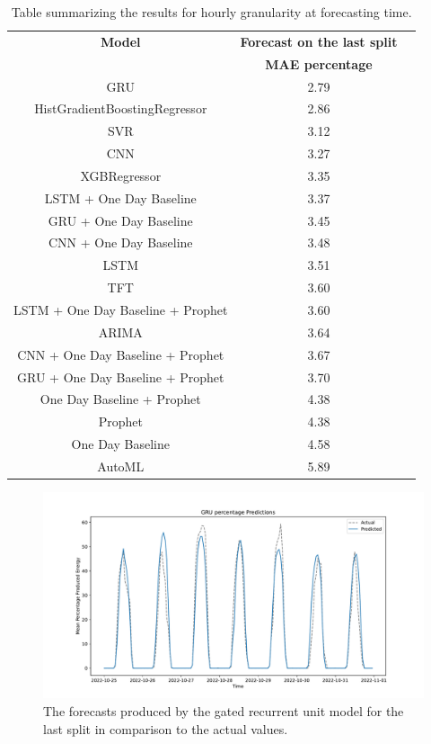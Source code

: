 \begin{table}[H]
\centering
\begin{tabular}{|c|c|c|}
\hline
\textbf{Model} & \textbf{Forecast on the last split}\\
 & \textbf{MAE percentage}\\
\hline
GRU & 2.79\\
\hline
HistGradientBoostingRegressor & 2.86\\
\hline
SVR & 3.12\\
\hline
CNN & 3.27\\
\hline
XGBRegressor & 3.35\\
\hline
LSTM + One Day Baseline & 3.37\\
\hline
GRU + One Day Baseline & 3.45\\
\hline
CNN + One Day Baseline & 3.48\\
\hline
LSTM & 3.51\\
\hline
TFT & 3.60\\
\hline
LSTM + One Day Baseline + Prophet & 3.60\\
\hline
ARIMA & 3.64\\
\hline
CNN + One Day Baseline + Prophet & 3.67\\
\hline
GRU + One Day Baseline + Prophet & 3.70\\
\hline
One Day Baseline + Prophet & 4.38\\
\hline
Prophet & 4.38\\
\hline
One Day Baseline & 4.58\\
\hline
AutoML & 5.89\\
\hline
\end{tabular}
\caption{Table summarizing the results for hourly granularity at forecasting time.}
\label{tab:productionhourlyresultsforecast}
\end{table}

\begin{figure}[H]
\centering
\includegraphics[width=1\textwidth]{images/production/GRU_percentage}
\caption{The forecasts produced by the gated recurrent unit model for the last split in comparison to the actual values.}
\label{fig:productiongruhourlyforecasts}
\end{figure}

